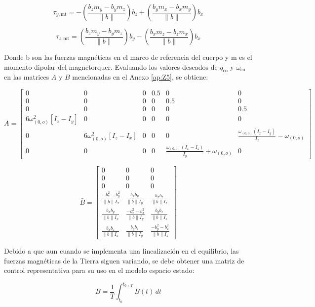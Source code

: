\begin{equation}
	\tau_{y,\text{mt}} = -\left( \frac{b_z m_y - b_y m_z}{\|b\|} \right) b_z + \left( \frac{b_y m_x - b_x m_y}{\|b\|} \right) b_x
	\label{eq:MT_y}
\end{equation}

\begin{equation}
	\tau_{z,\text{mt}} = \left( \frac{b_z m_y - b_y m_z}{\|b\|} \right) b_y - \left( \frac{b_x m_z - b_z m_x}{\|b\|} \right) b_x
	\label{eq:MT_z}
\end{equation}

Donde b son las fuerzas magnéticas en el marco de referencia del cuerpo y m es el momento dipolar del magnetorquer. Evaluando los valores deseados de $q_{\text{co}}$ y $\omega_{\text{co}}$ en las matrices $A$ y $B$ mencionadas en el Anexo \ref{ap:Z5}, se obtiene:

\[
	A = \begin{bmatrix}
		0 & 0 & 0 & 0.5 & 0 & 0 \\
		0 & 0 & 0 & 0 & 0.5 & 0 \\
		0 & 0 & 0 & 0 & 0 & 0.5 \\
		6\omega_{(0,o)}^2 [I_z - I_y] & 0 & 0 & 0 & 0 & 0 \\
		0 & 6\omega_{(0,o)}^2 [I_z - I_x] & 0 & 0 & 0 & \frac{\omega_{(0,o)} (I_x - I_y)}{I_z} - \omega_{(0,o)} \\
		0 & 0 & 0 & 0 & \frac{\omega_{(0,o)} (I_x - I_z)}{I_y} + \omega_{(0,o)} & 0
	\end{bmatrix}
\]

\[
	\bar{B} = \begin{bmatrix}
		0 & 0 & 0 \\
		0 & 0 & 0 \\
		0 & 0 & 0 \\
		\frac{-b_z^2 - b_y^2}{\|b\| I_x} & \frac{b_x b_y}{\|b\| I_y} & \frac{b_x b_z}{\|b\| I_z} \\
		\frac{b_x b_y}{\|b\| I_x} & \frac{-b_z^2 - b_x^2}{\|b\| I_y} & \frac{b_y b_z}{\|b\| I_z} \\
		\frac{b_x b_z}{\|b\| I_x} & \frac{b_y b_z}{\|b\| I_y} & \frac{-b_y^2 - b_x^2}{\|b\| I_z}
	\end{bmatrix}
\]

Debido a que aun cuando se implementa una linealización en el equilibrio, las fuerzas magnéticas de la Tierra siguen variando, se debe obtener una matriz de control representativa para su uso en el modelo espacio estado:

\[
	B = \frac{1}{T} \int_{t_0}^{t_{0+T}} \bar{B}(t) \, dt
\]

